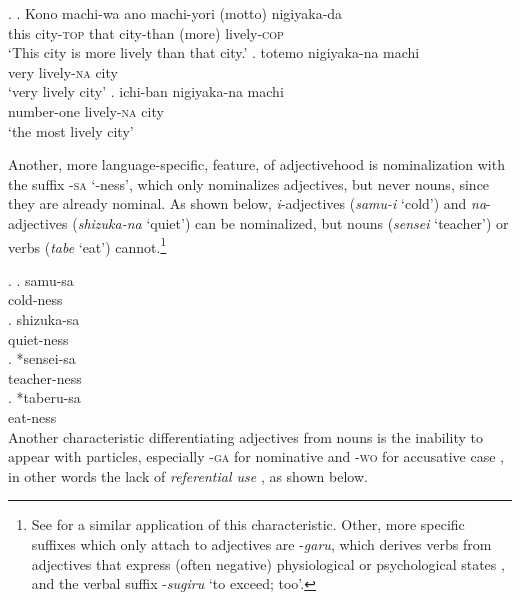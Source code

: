 \documentclass [output=book,colorlinks,citecolor=brown]{langscibook}
\begin{document}

\ex. \ag. Kono machi-wa ano machi-yori (motto) nigiyaka-da\\
this city-\textsc{top} that city-than (more) lively-\textsc{cop}\\
`This city is more lively than that city.’ \label{machi-yori}
\bg. totemo nigiyaka-na machi\\
very lively-\textsc{na} city\\
`very lively city' \label{totemonigiyaka}
\cg. ichi-ban nigiyaka-na machi\\
number-one lively-\textsc{na} city\\
`the most lively city' \label{machi-ichiban}

Another, more language-specific, feature, of adjectivehood is nominalization with the suffix -\textsc{sa} `-ness’, which only nominalizes adjectives, but never nouns, since they are already nominal. As shown below, \textit{i}-adjectives (\textit{samu-i} `cold’) and \textit{na}-adjectives (\textit{shizuka-na} `quiet’) can be nominalized, but nouns (\textit{sensei} `teacher’) or verbs (\textit{tabe} `eat’) cannot.\footnote{See \citet{teramura:1982:nihongo, wenck:1974:systematische, urushibara:1993:syntactic, rickmeyer:1995:japanische, kato:2003:nihongo, muraki:2012:nihongo} for a similar application of this characteristic. Other, more specific suffixes which only attach to adjectives are -\textit{garu}, which derives verbs from adjectives that express (often negative) physiological or psychological states \citep{urushibara:1993:syntactic}, and the verbal suffix -\textit{sugiru} `to exceed; too’.}


\ex. \ag. samu-sa\\
cold-ness\\
\bg. shizuka-sa\\
quiet-ness\\
\cg. *sensei-sa\\
teacher-ness\\
\dg. *taberu-sa\\
eat-ness\\

Another characteristic differentiating adjectives from nouns is the inability to appear with particles, especially -\textsc{ga} for nominative and -\textsc{wo} for accusative case \citep{suzuki:1972:nihon, martin:1975:reference, teramura:1982:nihongo, nakayama:2004:tokubetsu, muraki:2012:nihongo}, in other words the lack of \textit{referential use} \citep{oshima:2019:gradability}, as shown below.
\end{document}
